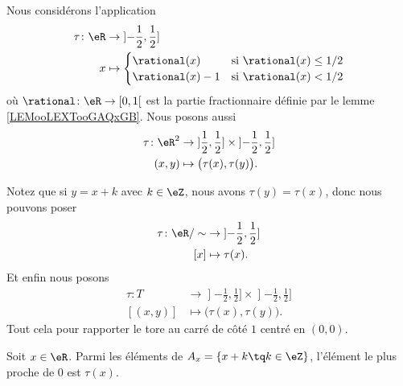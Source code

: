 Nous considérons l'application
\begin{equation}
	\begin{aligned}
		\tau\colon \eR & \to \mathopen] -\frac{ 1 }{2},\frac{ 1 }{2}\mathclose]   \\
		x              & \mapsto \begin{cases}
			                         \rational(x)   & \text{si } \rational(x)\leq 1/2 \\
			                         \rational(x)-1 & \text{si }\rational(x)<1/2
		                         \end{cases}
	\end{aligned}
\end{equation}
où \(\rational \colon \eR\to \mathopen[ 0,1\mathclose[  \) est la partie fractionnaire définie par le lemme \ref{LEMooLEXTooGAQxGB}. Nous posons aussi
\begin{equation}
	\begin{aligned}
		\tau\colon \eR^2 & \to \mathopen] \frac{ 1 }{2},\frac{ 1 }{2}\mathclose]\times \mathopen] -\frac{ 1 }{2},\frac{ 1 }{2}\mathclose] \\
		(x,y)            & \mapsto    \big( \tau(x),\tau(y) \big).
	\end{aligned}
\end{equation}

Notez que si \( y=x+k\) avec \( k\in \eZ\), nous avons \( \tau(y)=\tau(x)\), donc nous pouvons poser
\begin{equation}
	\begin{aligned}
		\tau\colon \eR/\sim & \to \mathopen] -\frac{ 1 }{2},\frac{ 1 }{2}\mathclose] \\
		[x]                 & \mapsto \tau(x).
	\end{aligned}
\end{equation}
Et enfin nous posons
\begin{equation}		\label{EQooCRZHooMNPBDo}
	\begin{aligned}
		\tau\colon T & \to \mathopen] -\frac{ 1 }{2},\frac{ 1 }{2}\mathclose]\times \mathopen] -\frac{ 1 }{2},\frac{ 1 }{2}\mathclose] \\
		[(x,y)]      & \mapsto \big( \tau(x),\tau(y) \big).
	\end{aligned}
\end{equation}
Tout cela pour rapporter le tore au carré de côté \( 1\) centré en \( (0,0)\).

\begin{proposition}	\label{PROPooNRNGooJahxQv}
	Soit \( x\in \eR\). Parmi les éléments de \( A_x=\{ x+k\tq k\in \eZ \}\), l'élément le plus proche de \( 0\) est \( \tau(x)\).
\end{proposition}

